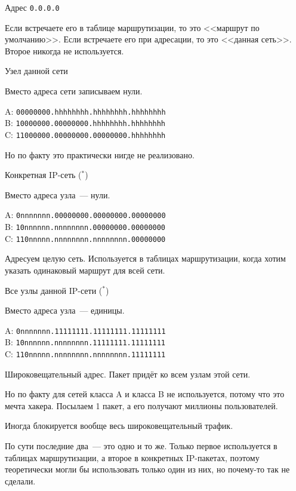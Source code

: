 \begin{MyItemize}
    \item Адрес {\tt 0.0.0.0}

    Если встречаете его в таблице маршрутизации, то это <<маршрут по умолчанию>>. Если встречаете его при адресации, то это <<данная сеть>>. Второе никогда не используется.
    \item Узел данной сети

    Вместо адреса сети записываем нули.

    A: {\tt 00000000.hhhhhhhh.hhhhhhhh.hhhhhhhh}\\
    B: {\tt 10000000.00000000.hhhhhhhh.hhhhhhhh}\\
    C: {\tt 11000000.00000000.00000000.hhhhhhhh}

    Но по факту это практически нигде не реализовано.

    \item Конкретная IP-сеть ($^*$)

    Вместо адреса узла~--- нули.

    A: {\tt 0nnnnnnn.00000000.00000000.00000000}\\
    B: {\tt 10nnnnnn.nnnnnnnn.00000000.00000000}\\
    C: {\tt 110nnnnn.nnnnnnnn.nnnnnnnn.00000000}

    Адресуем целую сеть. Используется в таблицах маршрутизации, когда хотим указать одинаковый маршрут для всей сети.

    \item Все узлы данной IP-сети ($^*$)

    Вместо адреса узла~--- единицы.

    A: {\tt 0nnnnnnn.11111111.11111111.11111111}\\
    B: {\tt 10nnnnnn.nnnnnnnn.11111111.11111111}\\
    C: {\tt 110nnnnn.nnnnnnnn.nnnnnnnn.11111111}

    Широковещательный адрес. Пакет придёт ко всем узлам этой сети. 

    Но по факту для сетей класса A и класса B не используется, потому что это мечта хакера. Посылаем 1 пакет, а его получают миллионы пользователей.

    Иногда блокируется вообще весь широковещательный трафик.

\end{MyItemize}

По сути последние два~--- это одно и то же. Только первое используется в таблицах маршрутизации, а второе в конкретных IP-пакетах, поэтому теоретически могли бы использовать только один из них, но почему-то так не сделали.

